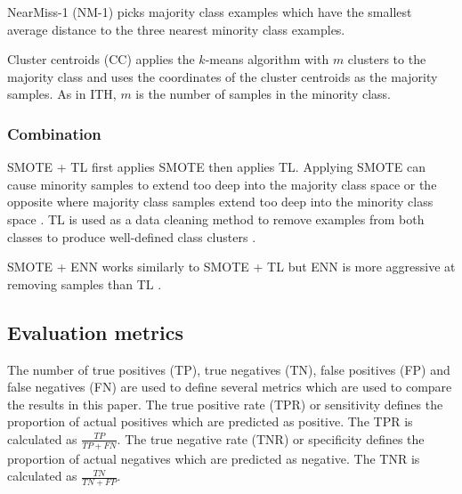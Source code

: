 \documentclass{sig-alternate-05-2015}
\begin{document}
	NearMiss-1 (NM-1) \cite{mani2003knn} picks majority class examples which have the smallest average distance to the three nearest minority class examples.
	
	Cluster centroids (CC) applies the $k$-means algorithm with $m$ clusters to the majority class and uses the coordinates of the cluster centroids as the majority samples. As in ITH, $m$ is the number of samples in the minority class.	
	
	\subsubsection{Combination}
	SMOTE + TL \cite{batista2003balancing} first applies SMOTE then applies TL. Applying SMOTE can cause minority samples to extend too deep into the majority class space or the opposite where majority class samples extend too deep into the minority class space \cite{batista2003balancing}. TL is used as a data cleaning method to remove examples from both classes to produce well-defined class clusters \cite{batista2003balancing}.
	
	SMOTE + ENN works similarly to SMOTE + TL but ENN is more aggressive at removing samples than TL \cite{Batista:2004:SBS:1007730.1007735}.
	
	\subsection{Evaluation metrics}
	The number of true positives (TP), true negatives (TN), false positives (FP) and false negatives (FN) are used to define several metrics which are used to compare the results in this paper. The true positive rate (TPR) or sensitivity defines the proportion of actual positives which are predicted as positive. The TPR is calculated as $\frac{TP}{TP + FN}$. The true negative rate (TNR) or specificity defines the proportion of actual negatives which are predicted as negative. The TNR is calculated as $\frac{TN}{TN + FP}$. 
	
\end{document}

